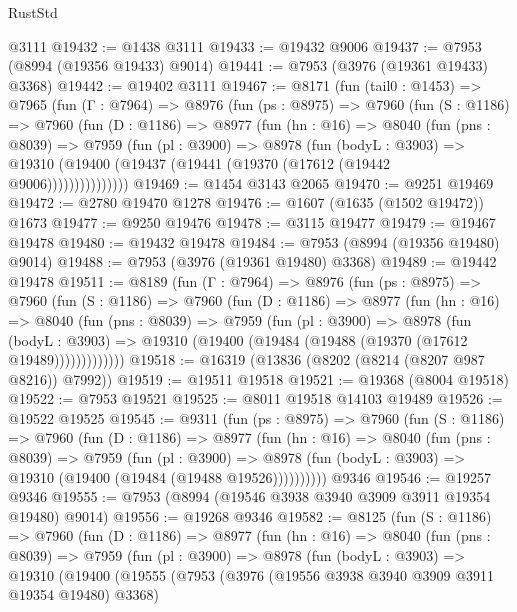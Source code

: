 \begin{lexlean}{RustStd}
\begin{coremodule}
    @3111
@19432 := @1438 @3111
@19433 := @19432 @9006
@19437 := @7953 (@8994 (@19356 @19433) @9014)
@19441 := @7953 (@3976 (@19361 @19433) @3368)
@19442 := @19402 @3111
@19467 := @8171
    (fun (tail0 : @1453) =>
    @7965
      (fun (Γ : @7964) =>
      @8976
        (fun (ps : @8975) =>
        @7960
          (fun (S : @1186) =>
          @7960
            (fun (D : @1186) =>
            @8977
              (fun (hn : @16) =>
              @8040
                (fun (pns : @8039) =>
                @7959
                  (fun (pl : @3900) =>
                  @8978
                    (fun (bodyL : @3903) =>
                    @19310 (@19400 (@19437 (@19441 (@19370 (@17612 (@19442 @9006)))))))))))))))
@19469 := @1454 @3143 @2065
@19470 := @9251 @19469
@19472 := @2780 @19470 @1278
@19476 := @1607 (@1635 (@1502 @19472)) @1673
@19477 := @9250 @19476
@19478 := @3115 @19477
@19479 := @19467 @19478
@19480 := @19432 @19478
@19484 := @7953 (@8994 (@19356 @19480) @9014)
@19488 := @7953 (@3976 (@19361 @19480) @3368)
@19489 := @19442 @19478
@19511 := @8189
    (fun (Γ : @7964) =>
    @8976
      (fun (ps : @8975) =>
      @7960
        (fun (S : @1186) =>
        @7960
          (fun (D : @1186) =>
          @8977
            (fun (hn : @16) =>
            @8040
              (fun (pns : @8039) =>
              @7959
                (fun (pl : @3900) =>
                @8978
                  (fun (bodyL : @3903) =>
                  @19310 (@19400 (@19484 (@19488 (@19370 (@17612 @19489)))))))))))))
@19518 := @16319 (@13836 (@8202 (@8214 (@8207 @987 @8216)) @7992))
@19519 := @19511 @19518
@19521 := @19368 (@8004 @19518)
@19522 := @7953 @19521
@19525 := @8011 @19518 @14103 @19489
@19526 := @19522 @19525
@19545 := @9311
    (fun (ps : @8975) =>
    @7960
      (fun (S : @1186) =>
      @7960
        (fun (D : @1186) =>
        @8977
          (fun (hn : @16) =>
          @8040
            (fun (pns : @8039) =>
            @7959
              (fun (pl : @3900) =>
              @8978 (fun (bodyL : @3903) => @19310 (@19400 (@19484 (@19488 @19526))))))))))
    @9346
@19546 := @19257 @9346
@19555 := @7953 (@8994 (@19546 @3938 @3940 @3909 @3911 @19354 @19480) @9014)
@19556 := @19268 @9346
@19582 := @8125
    (fun (S : @1186) =>
    @7960
      (fun (D : @1186) =>
      @8977
        (fun (hn : @16) =>
        @8040
          (fun (pns : @8039) =>
          @7959
            (fun (pl : @3900) =>
            @8978
              (fun (bodyL : @3903) =>
              @19310
                (@19400
                  (@19555
                    (@7953
                      (@3976 (@19556 @3938 @3940 @3909 @3911 @19354 @19480) @3368)

\end{coremodule}
\end{lexlean}
